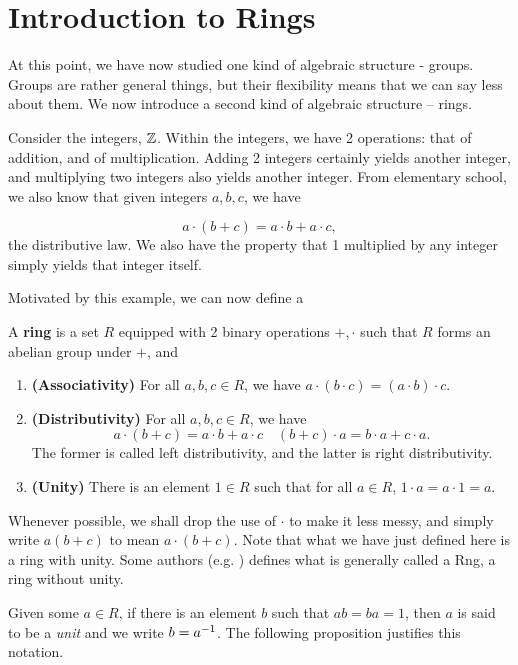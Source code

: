 \documentclass[./main.tex]{subfiles}
\begin{document}
\section{Introduction to Rings}
At this point, we have now studied one kind of algebraic structure - groups.
Groups are rather general things, but their flexibility means that we can say
less about them. We now introduce a second kind of algebraic structure -- rings.

Consider the integers, $\mathbb{Z}$. Within the integers, we have 2 operations: that of
addition, and of multiplication. Adding 2 integers certainly yields another
integer, and multiplying two integers also yields another integer. From
elementary school, we also know that given integers $a, b, c$, we have 

\[
    a \cdot (b + c) = a \cdot b + a \cdot c,
\]
the distributive law. We also have the property that 1 multiplied by any integer
simply yields that integer itself.

Motivated by this example, we can now define a
\begin{definition}[Ring]
\label{definition:ring}
    A \textbf{ring} is a set $R$ equipped with 2 binary operations $+, \cdot$
    such that $R$ forms an abelian group under $+$, and 
    \begin{enumerate}
        \item \textbf{(Associativity)} For all $a, b, c \in R$, we have $a \cdot (b \cdot c) = (a \cdot b) \cdot c$.
        \item \textbf{(Distributivity)} For all $a, b, c \in R$, we have 
            \[
                a \cdot (b + c) = a \cdot b + a \cdot c \quad (b + c) \cdot a = b \cdot a + c \cdot a.
            \]
            The former is called left distributivity, and the latter is right distributivity.
        \item \textbf{(Unity)} There is an element $1 \in R$ such that for all $a \in R$, $1
        \cdot a = a \cdot 1 = a$.
    \end{enumerate}
\end{definition}
Whenever possible, we shall drop the use of $\cdot$ to make it less messy, and
simply write $a(b+c)$ to mean $a \cdot (b+c)$. Note that what we have just
defined here is a ring with unity. Some authors (e.g. \autocite{Gallian_2020})
defines what is generally called a Rng, a ring without unity. 

Given some $a \in R$, if there is an element $b$ such that $ab = ba = 1$, then
$a$ is said to be a \emph{unit} and we write $b = a^{-1}$. The following
proposition justifies this notation.
\end{document}
